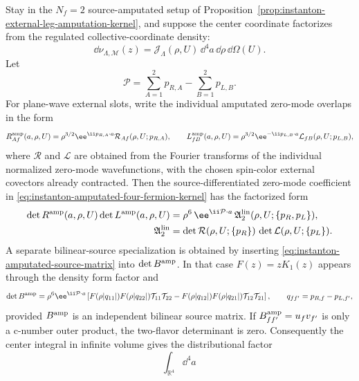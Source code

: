 \begin{proposition}
\label{prop:instanton-plane-wave-four-fermion-assembly}
Stay in the \(N_f=2\) source-amputated setup of
Proposition~\ref{prop:instanton-external-leg-amputation-kernel}, and suppose
the center coordinate factorizes from the regulated collective-coordinate
density:
\[
  \dd\nu_{\Lambda,\mathcal M}(z)
  =
  \mathcal J_\Lambda(\rho,U)\,
  \dd^4a\,\dd\rho\,\dd\Omega(U).
\]
Let
\[
  \mathcal P
  =
  \sum_{A=1}^{2}p_{R,A}
  -
  \sum_{B=1}^{2}p_{L,B}.
\]
For plane-wave external slots, write the individual amputated zero-mode
overlaps in the form
\[
  R^{\rm amp}_{Af}(a,\rho,U)
  =
  \rho^{3/2}\ee^{\ii p_{R,A}\cdot a}
  \mathcal R_{Af}(\rho,U;p_{R,A}),
  \qquad
  L^{\rm amp}_{fB}(a,\rho,U)
  =
  \rho^{3/2}\ee^{-\ii p_{L,B}\cdot a}
  \mathcal L_{fB}(\rho,U;p_{L,B}),
\]
where \(\mathcal R\) and \(\mathcal L\) are obtained from the Fourier
transforms of the individual normalized zero-mode wavefunctions, with the
chosen spin-color external covectors already contracted.  Then the
source-differentiated zero-mode coefficient in
\eqref{eq:instanton-amputated-four-fermion-kernel} has the factorized form
\begin{equation}
\begin{aligned}
  \det R^{\rm amp}(a,\rho,U)\det L^{\rm amp}(a,\rho,U)
  &=
  \rho^6\,
  \ee^{\ii\mathcal P\cdot a}\,
  \mathfrak A_2^{\rm lin}(\rho,U;\{p_R,p_L\}),\\
  \mathfrak A_2^{\rm lin}
  &=
  \det\mathcal R(\rho,U;\{p_R\})\,
  \det\mathcal L(\rho,U;\{p_L\}).
\end{aligned}
  \label{eq:instanton-plane-wave-source-determinant}
\end{equation}
A separate bilinear-source specialization is obtained by inserting
\eqref{eq:instanton-amputated-source-matrix} into \(\det B^{\rm amp}\).  In
that case \(F(z)=zK_1(z)\) appears through the density form factor and
\[
  \det B^{\rm amp}
  =
  \rho^6\ee^{\ii\mathcal P\cdot a}
  \left[
    F(\rho|q_{11}|)F(\rho|q_{22}|)
    \mathcal T_{11}\mathcal T_{22}
    -
    F(\rho|q_{12}|)F(\rho|q_{21}|)
    \mathcal T_{12}\mathcal T_{21}
  \right],
  \qquad q_{ff'}=p_{R,f}-p_{L,f'} ,
\]
provided \(B^{\rm amp}\) is an independent bilinear source matrix.  If
\(B^{\rm amp}_{ff'}=u_fv_{f'}\) is only a c-number outer product, the
two-flavor determinant is zero.
Consequently the center integral in infinite volume gives the distributional
factor
\begin{equation}
  \int_{\mathbb R^4}\dd^4a\,

\end{equation}
\end{proposition}
